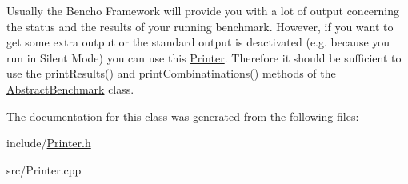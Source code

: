 Usually the Bencho Framework will provide you with a lot of output concerning the status and the results of your running benchmark. However, if you want to get some extra output or the standard output is deactivated (e.\-g. because you run in Silent Mode) you can use this \hyperlink{classPrinter}{Printer}. Therefore it should be sufficient to use the print\-Results() and print\-Combinatinations() methods of the \hyperlink{classAbstractBenchmark}{Abstract\-Benchmark} class. 

The documentation for this class was generated from the following files\-:\begin{DoxyCompactItemize}
\item 
include/\hyperlink{Printer_8h}{Printer.\-h}\item 
src/Printer.\-cpp\end{DoxyCompactItemize}
